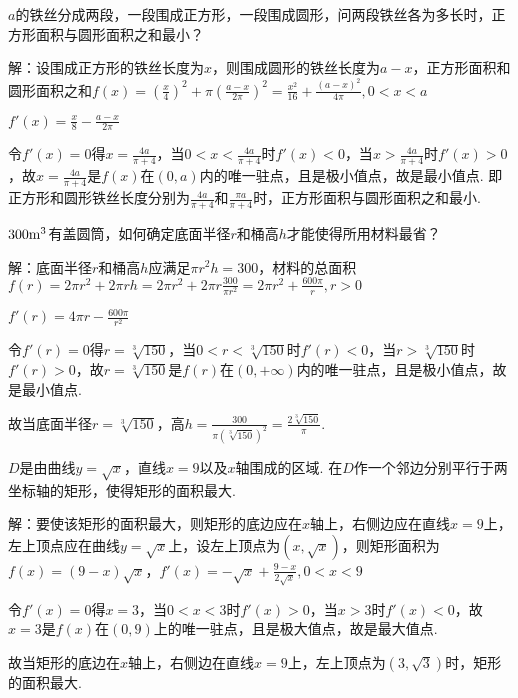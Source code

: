 \documentclass[12pt,UTF8]{ctexart}
\begin{document}
\begin{enumerate}
$a$的铁丝分成两段，一段围成正方形，一段围成圆形，问两段铁丝各为多长时，正方形面积与圆形面积之和最小？

解：设围成正方形的铁丝长度为$x$，则围成圆形的铁丝长度为$a-x$，正方形面积和圆形面积之和$f(x)=(\frac x4)^2+\pi(\frac{a-x}{2\pi})^2=\frac{x^2}{16}+\frac{(a-x)^2}{4\pi},0<x<a$

$f'(x)=\frac x8-\frac{a-x}{2\pi}$

令$f'(x)=0$得$x=\frac{4a}{\pi+4}$，当$0<x<\frac{4a}{\pi+4}$时$f'(x)<0$，当$x>\frac{4a}{\pi+4}$时$f'(x)>0$，故$x=\frac{4a}{\pi+4}$是$f(x)$在$(0,a)$内的唯一驻点，且是极小值点，故是最小值点. 即正方形和圆形铁丝长度分别为$\frac{4a}{\pi+4}$和$\frac{\pi a}{\pi+4}$时，正方形面积与圆形面积之和最小.

$300\rm m^3$有盖圆筒，如何确定底面半径$r$和桶高$h$才能使得所用材料最省？

解：底面半径$r$和桶高$h$应满足$\pi r^2h=300$，材料的总面积$f(r)=2\pi r^2+2\pi rh=2\pi r^2+2\pi r\frac{300}{\pi r^2}=2\pi r^2+\frac{600\pi}r,r>0$

$f'(r)=4\pi r-\frac{600\pi}{r^2}$

令$f'(r)=0$得$r=\sqrt[3]{150}$，当$0<r<\sqrt[3]{150}$时$f'(r)<0$，当$r>\sqrt[3]{150}$时$f'(r)>0$，故$r=\sqrt[3]{150}$是$f(r)$在$(0,+\infty)$内的唯一驻点，且是极小值点，故是最小值点. 

故当底面半径$r=\sqrt[3]{150}$，高$h=\frac{300}{\pi (\sqrt[3]{150})^2}=\frac{2\sqrt[3]{150}}\pi$.

$D$是由曲线$y=\sqrt x$，直线$x=9$以及$x$轴围成的区域. 在$D$作一个邻边分别平行于两坐标轴的矩形，使得矩形的面积最大.

解：要使该矩形的面积最大，则矩形的底边应在$x$轴上，右侧边应在直线$x=9$上，左上顶点应在曲线$y=\sqrt x$上，设左上顶点为$(x,\sqrt x)$，则矩形面积为$f(x)=(9-x)\sqrt x$，$f'(x)=-\sqrt x+\frac{9-x}{2\sqrt x},0<x<9$

令$f'(x)=0$得$x=3$，当$0<x<3$时$f'(x)>0$，当$x>3$时$f'(x)<0$，故$x=3$是$f(x)$在$(0,9)$上的唯一驻点，且是极大值点，故是最大值点. 

故当矩形的底边在$x$轴上，右侧边在直线$x=9$上，左上顶点为$(3,\sqrt 3)$时，矩形的面积最大.
\end{enumerate}
\end{document}
